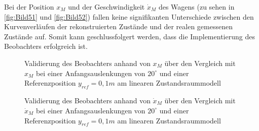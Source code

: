 Bei der Position $x_M$ und der Geschwindigkeit $\dot{x}_M$ des Wagens (zu sehen in \autoref{fig:Bild51} und \autoref{fig:Bild52}) fallen keine signifikanten Unterschiede zwischen den Kurvenverläufen der rekonstruierten Zustände und der realen \bzw gemessenen Zustände auf. Somit kann geschlussfolgert werden, dass die Implementierung des Beobachters erfolgreich ist.

\begin{figure}[H]
    \centering
    \caption[Vergleich $x_M$, $\hat{x}_M$]{Validierung des Beobachters anhand von $x_M$ über den Vergleich mit $\hat{x}_M$ bei einer Anfangsauslenkungen von $20^\circ$ und einer Referenzposition $y_{ref} = 0,1 m$ am linearen Zustandsraummodell}
    \label{fig:Bild51}
\end{figure}

\begin{figure}[H]
    \centering
    \caption[Vergleich $\dot{x}_M$, $\hat{\dot{x}}_M$]{Validierung des Beobachters anhand von $\dot{x}_M$ über den Vergleich mit $\hat{\dot{x}}_M$ bei einer Anfangsauslenkungen von $20^\circ$ und einer Referenzposition $y_{ref} = 0,1 m$ am linearen Zustandsraummodell}
    \label{fig:Bild52}
\end{figure}


